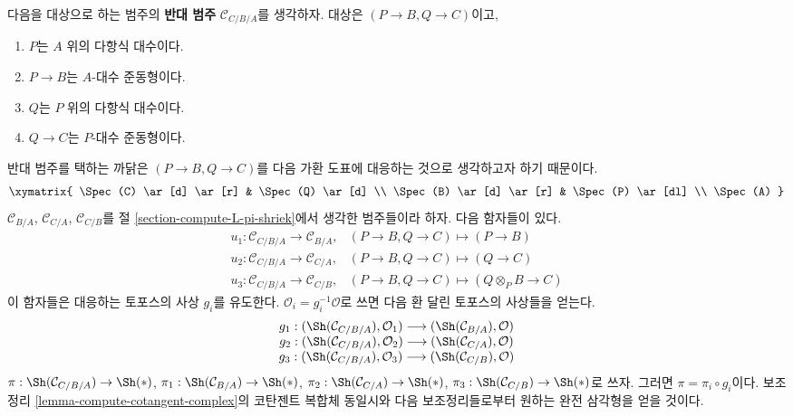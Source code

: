 \medskip\noindent
다음을 대상으로 하는 범주의 {\bf 반대 범주}
$\mathcal{C}_{C/B/A}$를 생각하자. 대상은 $(P\to B,Q\to C)$이고,
\begin{enumerate}
\item $P$는 $A$ 위의 다항식 대수이다.
\item $P\to B$는 $A$-대수 준동형이다.
\item $Q$는 $P$ 위의 다항식 대수이다.
\item $Q\to C$는 $P$-대수 준동형이다.
\end{enumerate}
반대 범주를 택하는 까닭은 $(P\to B,Q\to C)$를 다음 가환 도표에
대응하는 것으로 생각하고자 하기 때문이다.
$$
\xymatrix{
\Spec(C) \ar[d] \ar[r] & \Spec(Q) \ar[d] \\
\Spec(B) \ar[d] \ar[r] & \Spec(P) \ar[dl] \\
\Spec(A)
}
$$
$\mathcal{C}_{B/A}$, $\mathcal{C}_{C/A}$, $\mathcal{C}_{C/B}$를 절
\ref{section-compute-L-pi-shriek}에서 생각한 범주들이라 하자. 다음
함자들이 있다.
$$
\begin{matrix}
u_1 : \mathcal{C}_{C/B/A} \to \mathcal{C}_{B/A}, &
(P \to B, Q \to C) \mapsto (P \to B) \\
u_2 : \mathcal{C}_{C/B/A} \to \mathcal{C}_{C/A}, &
(P \to B, Q \to C) \mapsto (Q \to C) \\
u_3 : \mathcal{C}_{C/B/A} \to \mathcal{C}_{C/B}, &
(P \to B, Q \to C) \mapsto (Q \otimes_P B \to C)
\end{matrix}
$$
이 함자들은 대응하는 토포스의 사상 $g_i$를 유도한다.
$\mathcal{O}_i=g_i^{-1}\mathcal{O}$로 쓰면 다음 환 달린 토포스의 사상들을
얻는다.
\begin{equation}
\label{equation-three-maps}
\begin{matrix}
g_1 : (\Sh(\mathcal{C}_{C/B/A}), \mathcal{O}_1)
\longrightarrow (\Sh(\mathcal{C}_{B/A}), \mathcal{O}) \\
g_2 : (\Sh(\mathcal{C}_{C/B/A}), \mathcal{O}_2)
\longrightarrow (\Sh(\mathcal{C}_{C/A}), \mathcal{O}) \\
g_3 : (\Sh(\mathcal{C}_{C/B/A}), \mathcal{O}_3)
\longrightarrow (\Sh(\mathcal{C}_{C/B}), \mathcal{O})
\end{matrix}
\end{equation}
$\pi:\Sh(\mathcal{C}_{C/B/A})\to\Sh(*)$,
$\pi_1:\Sh(\mathcal{C}_{B/A})\to\Sh(*)$,
$\pi_2:\Sh(\mathcal{C}_{C/A})\to\Sh(*)$,
$\pi_3:\Sh(\mathcal{C}_{C/B})\to\Sh(*)$로 쓰자. 그러면
$\pi=\pi_i\circ g_i$이다. 보조정리
\ref{lemma-compute-cotangent-complex}의 코탄젠트 복합체 동일시와 다음
보조정리들로부터 원하는 완전 삼각형을 얻을 것이다.

